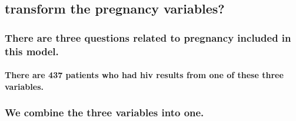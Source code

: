 \documentclass[
]{article}
\newenvironment{Shaded}{\begin{snugshade}}{\end{snugshade}}
\newcommand{\CommentTok}[1]{\textcolor[rgb]{0.56,0.35,0.01}{\textit{#1}}}
\newcommand{\DataTypeTok}[1]{\textcolor[rgb]{0.13,0.29,0.53}{#1}}
\newcommand{\DecValTok}[1]{\textcolor[rgb]{0.00,0.00,0.81}{#1}}
\newcommand{\KeywordTok}[1]{\textcolor[rgb]{0.13,0.29,0.53}{\textbf{#1}}}
\newcommand{\NormalTok}[1]{#1}
\newcommand{\OperatorTok}[1]{\textcolor[rgb]{0.81,0.36,0.00}{\textbf{#1}}}
\newcommand{\StringTok}[1]{\textcolor[rgb]{0.31,0.60,0.02}{#1}}
\let\oldparagraph\paragraph
\renewcommand{\paragraph}[1]{\oldparagraph{#1}\mbox{}}
\begin{document}
\hypertarget{transform-the-pregnancy-variables}{%
\subsection{transform the pregnancy
variables?}\label{transform-the-pregnancy-variables}}

\hypertarget{there-are-three-questions-related-to-pregnancy-included-in-this-model.}{%
\subsubsection{There are three questions related to pregnancy included
in this
model.}\label{there-are-three-questions-related-to-pregnancy-included-in-this-model.}}

\begin{Shaded}
\end{Shaded}

\hypertarget{there-are-437-patients-who-had-hiv-results-from-one-of-these-three-variables.}{%
\paragraph{There are 437 patients who had hiv results from one of these
three
variables.}\label{there-are-437-patients-who-had-hiv-results-from-one-of-these-three-variables.}}

\hypertarget{we-combine-the-three-variables-into-one.}{%
\subsubsection{We combine the three variables into
one.}\label{we-combine-the-three-variables-into-one.}}

\begin{Shaded}
\end{Shaded}
\end{document}
